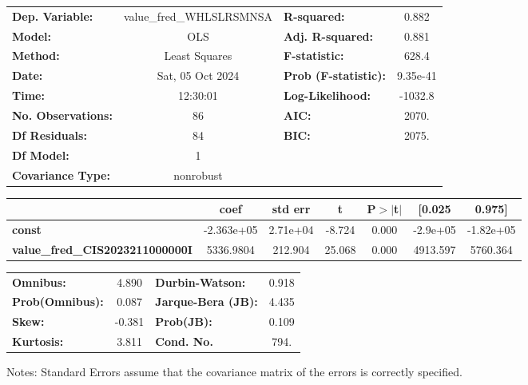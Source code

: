 \begin{center}
\begin{tabular}{lclc}
\toprule
\textbf{Dep. Variable:}                 & value\_fred\_WHLSLRSMNSA & \textbf{  R-squared:         } &     0.882   \\
\textbf{Model:}                         &           OLS            & \textbf{  Adj. R-squared:    } &     0.881   \\
\textbf{Method:}                        &      Least Squares       & \textbf{  F-statistic:       } &     628.4   \\
\textbf{Date:}                          &     Sat, 05 Oct 2024     & \textbf{  Prob (F-statistic):} &  9.35e-41   \\
\textbf{Time:}                          &         12:30:01         & \textbf{  Log-Likelihood:    } &   -1032.8   \\
\textbf{No. Observations:}              &              86          & \textbf{  AIC:               } &     2070.   \\
\textbf{Df Residuals:}                  &              84          & \textbf{  BIC:               } &     2075.   \\
\textbf{Df Model:}                      &               1          & \textbf{                     } &             \\
\textbf{Covariance Type:}               &        nonrobust         & \textbf{                     } &             \\
\bottomrule
\end{tabular}
\begin{tabular}{lcccccc}
                                        & \textbf{coef} & \textbf{std err} & \textbf{t} & \textbf{P$> |$t$|$} & \textbf{[0.025} & \textbf{0.975]}  \\
\midrule
\textbf{const}                          &   -2.363e+05  &     2.71e+04     &    -8.724  &         0.000        &     -2.9e+05    &    -1.82e+05     \\
\textbf{value\_fred\_CIS2023211000000I} &    5336.9804  &      212.904     &    25.068  &         0.000        &     4913.597    &     5760.364     \\
\bottomrule
\end{tabular}
\begin{tabular}{lclc}
\textbf{Omnibus:}       &  4.890 & \textbf{  Durbin-Watson:     } &    0.918  \\
\textbf{Prob(Omnibus):} &  0.087 & \textbf{  Jarque-Bera (JB):  } &    4.435  \\
\textbf{Skew:}          & -0.381 & \textbf{  Prob(JB):          } &    0.109  \\
\textbf{Kurtosis:}      &  3.811 & \textbf{  Cond. No.          } &     794.  \\
\bottomrule
\end{tabular}
\end{center}

Notes: \newline
 [1] Standard Errors assume that the covariance matrix of the errors is correctly specified.